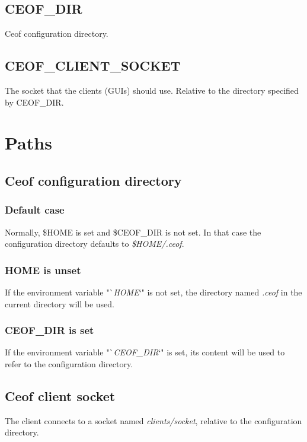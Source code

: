\documentclass[12pt,a4paper]{article}
\begin{document}
\subsection{CEOF\_DIR}
Ceof configuration directory.
\subsection{CEOF\_CLIENT\_SOCKET}
The socket that the clients (GUIs) should use.
Relative to the directory specified by CEOF\_DIR.
\section{Paths}
\subsection{Ceof configuration directory}
\subsubsection{Default case}
Normally, \$HOME is set and \$CEOF\_DIR is not set. In that case
the configuration directory defaults to \textit{\$HOME/.ceof}.
\subsubsection{HOME is unset}
If the environment variable "`\textit{HOME}`" is not set,
the directory named \textit{.ceof} in the current directory will be used.
\subsubsection{CEOF\_DIR is set}
If the environment variable "`\textit{CEOF\_DIR}`" is set,
its content will be used to refer to the configuration directory.
\subsection{Ceof client socket}
The client connects to a socket named \textit{clients/socket}, relative
to the configuration directory.
\end{document}
